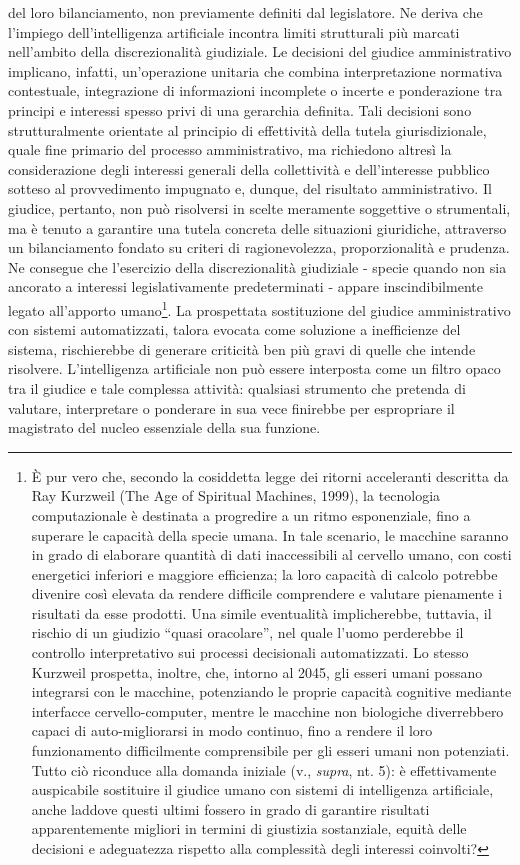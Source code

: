 \documentclass[american,a4paper,]{article}
\begin{document}
del loro bilanciamento, non previamente definiti dal legislatore. Ne deriva che l'impiego dell'intelligenza artificiale incontra limiti strutturali più marcati nell'ambito della discrezionalità giudiziale. Le decisioni del giudice amministrativo implicano, infatti, un'operazione unitaria che combina interpretazione normativa contestuale, integrazione di informazioni incomplete o incerte e ponderazione tra principi e interessi spesso privi di una gerarchia definita. Tali decisioni sono strutturalmente orientate al principio di effettività della tutela giurisdizionale, quale fine primario del processo amministrativo, ma richiedono altresì la considerazione degli interessi generali della collettività e dell'interesse pubblico sotteso al provvedimento impugnato e, dunque, del risultato amministrativo. Il giudice, pertanto, non può risolversi in scelte meramente soggettive o strumentali, ma è tenuto a garantire una tutela concreta delle situazioni giuridiche, attraverso un bilanciamento fondato su criteri di ragionevolezza, proporzionalità e prudenza. Ne consegue che l'esercizio della discrezionalità giudiziale - specie quando non sia ancorato a interessi legislativamente predeterminati - appare inscindibilmente legato all'apporto umano\footnote{È pur vero che, secondo la cosiddetta legge dei ritorni acceleranti descritta da Ray Kurzweil (The Age of Spiritual Machines, 1999), la tecnologia computazionale è destinata a progredire a un ritmo esponenziale, fino a superare le capacità della specie umana. In tale scenario, le macchine saranno in grado di elaborare quantità di dati inaccessibili al cervello umano, con costi energetici inferiori e maggiore efficienza; la loro capacità di calcolo potrebbe divenire così elevata da rendere difficile comprendere e valutare pienamente i risultati da esse prodotti. Una simile eventualità implicherebbe, tuttavia, il rischio di un giudizio ``quasi oracolare'', nel quale l'uomo perderebbe il controllo interpretativo sui processi decisionali automatizzati. Lo stesso Kurzweil prospetta, inoltre, che, intorno al 2045, gli esseri umani possano integrarsi con le macchine, potenziando le proprie capacità cognitive mediante interfacce cervello-computer, mentre le macchine non biologiche diverrebbero capaci di auto-migliorarsi in modo continuo, fino a rendere il loro funzionamento difficilmente comprensibile per gli esseri umani non potenziati. Tutto ciò riconduce alla domanda iniziale (v., \emph{supra}, nt. 5): è effettivamente auspicabile sostituire il giudice umano con sistemi di intelligenza artificiale, anche laddove questi ultimi fossero in grado di garantire risultati apparentemente migliori in termini di giustizia sostanziale, equità delle decisioni e adeguatezza rispetto alla complessità degli interessi coinvolti?}. La prospettata sostituzione del giudice amministrativo con sistemi automatizzati, talora evocata come soluzione a inefficienze del sistema, rischierebbe di generare criticità ben più gravi di quelle che intende risolvere. L'intelligenza artificiale non può essere interposta come un filtro opaco tra il giudice e tale complessa attività: qualsiasi strumento che pretenda di valutare, interpretare o ponderare in sua vece finirebbe per espropriare il magistrato del nucleo essenziale della sua funzione.
\end{document}
